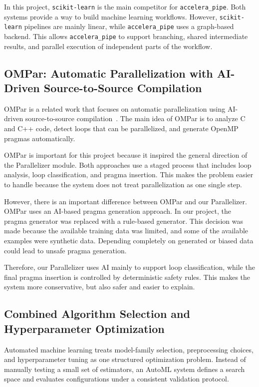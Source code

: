 \documentclass[12pt,a4paper]{report}
\begin{document}
In this project, \texttt{scikit-learn} is the main competitor for
\texttt{accelera\_pipe}. Both systems provide a way to build machine learning
workflows. However, \texttt{scikit-learn} pipelines are mainly linear, while
\texttt{accelera\_pipe} uses a graph-based backend. This allows
\texttt{accelera\_pipe} to support branching, shared intermediate results, and
parallel execution of independent parts of the workflow.

\subsection{OMPar: Automatic Parallelization with AI-Driven Source-to-Source Compilation}

OMPar is a related work that focuses on automatic parallelization using
AI-driven source-to-source compilation~\cite{ompar2024}. The main idea of
OMPar is to analyze C and C++ code, detect loops that can be parallelized, and
generate OpenMP pragmas automatically.

OMPar is important for this project because it inspired the general direction of
the Parallelizer module. Both approaches use a staged process that includes loop
analysis, loop classification, and pragma insertion. This makes the problem
easier to handle because the system does not treat parallelization as one single
step.

However, there is an important difference between OMPar and our Parallelizer.
OMPar uses an AI-based pragma generation approach. In our project, the pragma
generator was replaced with a rule-based generator. This decision was made
because the available training data was limited, and some of the available
examples were synthetic data. Depending completely on generated or biased data
could lead to unsafe pragma generation.

Therefore, our Parallelizer uses AI mainly to support loop classification, while
the final pragma insertion is controlled by deterministic safety rules. This
makes the system more conservative, but also safer and easier to explain.

\subsection{Combined Algorithm Selection and Hyperparameter Optimization}
Automated machine learning treats model-family selection, preprocessing choices,
and hyperparameter tuning as one structured optimization problem. Instead of
manually testing a small set of estimators, an AutoML system defines a search
space and evaluates configurations under a consistent validation protocol.
\end{document}
